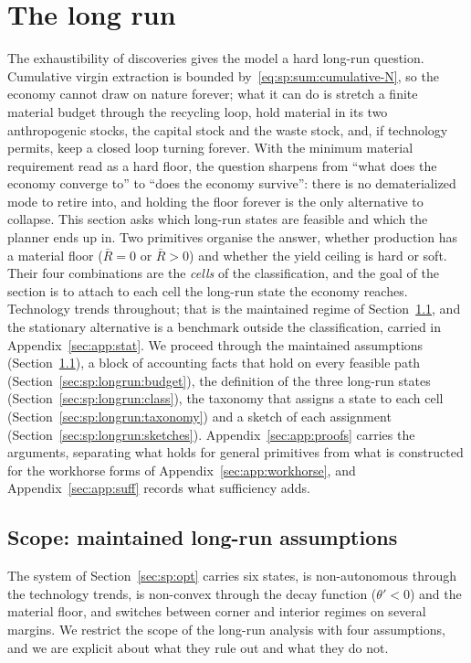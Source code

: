 \section{The long run}\label{sec:sp:longrun}

The exhaustibility of discoveries gives the model a hard long-run question. Cumulative virgin extraction is bounded by~\eqref{eq:sp:sum:cumulative-N}, so the economy cannot draw on nature forever; what it can do is stretch a finite material budget through the recycling loop, hold material in its two anthropogenic stocks, the capital stock and the waste stock, and, if technology permits, keep a closed loop turning forever. With the minimum material requirement read as a hard floor, the question sharpens from ``what does the economy converge to'' to ``does the economy survive'': there is no dematerialized mode to retire into, and holding the floor forever is the only alternative to collapse. This section asks which long-run states are feasible and which the planner ends up in. Two primitives organise the answer, whether production has a material floor ($\bar R=0$ or $\bar R>0$) and whether the yield ceiling is hard or soft. Their four combinations are the \emph{cells} of the classification, and the goal of the section is to attach to each cell the long-run state the economy reaches. Technology trends throughout; that is the maintained regime of Section~\ref{sec:sp:longrun:scope}, and the stationary alternative is a benchmark outside the classification, carried in Appendix~\ref{sec:app:stat}. We proceed through the maintained assumptions (Section~\ref{sec:sp:longrun:scope}), a block of accounting facts that hold on every feasible path (Section~\ref{sec:sp:longrun:budget}), the definition of the three long-run states (Section~\ref{sec:sp:longrun:class}), the taxonomy that assigns a state to each cell (Section~\ref{sec:sp:longrun:taxonomy}) and a sketch of each assignment (Section~\ref{sec:sp:longrun:sketches}). Appendix~\ref{sec:app:proofs} carries the arguments, separating what holds for general primitives from what is constructed for the workhorse forms of Appendix~\ref{sec:app:workhorse}, and Appendix~\ref{sec:app:suff} records what sufficiency adds.

\subsection{Scope: maintained long-run assumptions}\label{sec:sp:longrun:scope}

The system of Section~\ref{sec:sp:opt} carries six states, is non-autonomous through the technology trends, is non-convex through the decay function ($\theta'<0$) and the material floor, and switches between corner and interior regimes on several margins. We restrict the scope of the long-run analysis with four assumptions, and we are explicit about what they rule out and what they do not.

